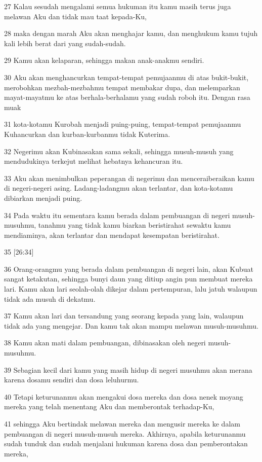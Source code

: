 \par 27 Kalau sesudah mengalami semua hukuman itu kamu masih terus juga melawan Aku dan tidak mau taat kepada-Ku,
\par 28 maka dengan marah Aku akan menghajar kamu, dan menghukum kamu tujuh kali lebih berat dari yang sudah-sudah.
\par 29 Kamu akan kelaparan, sehingga makan anak-anakmu sendiri.
\par 30 Aku akan menghancurkan tempat-tempat pemujaanmu di atas bukit-bukit, merobohkan mezbah-mezbahmu tempat membakar dupa, dan melemparkan mayat-mayatmu ke atas berhala-berhalamu yang sudah roboh itu. Dengan rasa muak
\par 31 kota-kotamu Kurobah menjadi puing-puing, tempat-tempat pemujaanmu Kuhancurkan dan kurban-kurbanmu tidak Kuterima.
\par 32 Negerimu akan Kubinasakan sama sekali, sehingga musuh-musuh yang mendudukinya terkejut melihat hebatnya kehancuran itu.
\par 33 Aku akan menimbulkan peperangan di negerimu dan menceraiberaikan kamu di negeri-negeri asing. Ladang-ladangmu akan terlantar, dan kota-kotamu dibiarkan menjadi puing.
\par 34 Pada waktu itu sementara kamu berada dalam pembuangan di negeri musuh-musuhmu, tanahmu yang tidak kamu biarkan beristirahat sewaktu kamu mendiaminya, akan terlantar dan mendapat kesempatan beristirahat.
\par 35 [26:34]
\par 36 Orang-orangmu yang berada dalam pembuangan di negeri lain, akan Kubuat sangat ketakutan, sehingga bunyi daun yang ditiup angin pun membuat mereka lari. Kamu akan lari seolah-olah dikejar dalam pertempuran, lalu jatuh walaupun tidak ada musuh di dekatmu.
\par 37 Kamu akan lari dan tersandung yang seorang kepada yang lain, walaupun tidak ada yang mengejar. Dan kamu tak akan mampu melawan musuh-musuhmu.
\par 38 Kamu akan mati dalam pembuangan, dibinasakan oleh negeri musuh-musuhmu.
\par 39 Sebagian kecil dari kamu yang masih hidup di negeri musuhmu akan merana karena dosamu sendiri dan dosa leluhurmu.
\par 40 Tetapi keturunanmu akan mengakui dosa mereka dan dosa nenek moyang mereka yang telah menentang Aku dan memberontak terhadap-Ku,
\par 41 sehingga Aku bertindak melawan mereka dan mengusir mereka ke dalam pembuangan di negeri musuh-musuh mereka. Akhirnya, apabila keturunanmu sudah tunduk dan sudah menjalani hukuman karena dosa dan pemberontakan mereka,
